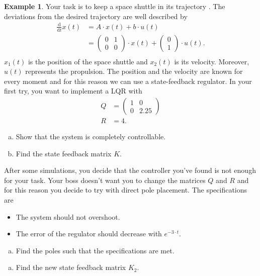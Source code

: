 \documentclass[a4paper,12 pt]{article}
\numberwithin{equation}{section}
\theoremstyle{definition}
\newtheorem{bsp}{Example}
\theoremstyle{remark}
\theoremstyle{definition}
\theoremstyle{definition}
\theoremstyle{definition}
\theoremstyle{remark}
\newcommand{\dd}[2]{\frac{\text{d}#1}{\text{d}#2}}
\begin{document}
\begin{bsp}
Your task is to keep a space shuttle in its trajectory . The deviations from the desired trajectory are well described by
\begin{equation*}
\begin{split}
 \dd{}{t} x(t) &= A \cdot x(t) + b \cdot u(t) \\
&= \begin{pmatrix} 0&1\\ 0&0 \end{pmatrix} \cdot x(t) + \begin{pmatrix} 0\\ 1\end{pmatrix} \cdot u(t). \\
 \end{split}
\end{equation*}
$x_1(t)$ is the position of the space shuttle and $x_2(t)$ is its velocity. Moreover, $u(t)$ represents the propulsion. The position and the velocity are known for every moment and for this reason we can use a state-feedback regulator. In your first try, you want to implement a LQR with
\begin{equation*}
\begin{split}
Q&=\begin{pmatrix}
1&0\\
0&2.25
\end{pmatrix}\\
R&=4.
\end{split}
\end{equation*}
\begin{enumerate}[(a)]
\item Show that the system is completely controllable.
\item Find the state feedback matrix $K$.
\end{enumerate}
After some simulations, you decide that the controller you've found is not enough for your task. Your boss doesn't want you to change the matrices $Q$ and $R$ and for this reason you decide to try with direct pole placement. The specifications are
\begin{itemize}
\item The system should not overshoot.
\item The error of the regulator should decrease with $e^{-3\cdot t}$.
\end{itemize}
\begin{enumerate}[(c)]
\item Find the poles such that the specifications are met.
\end{enumerate}
\begin{enumerate}[(d)]
\item Find the new state feedback matrix $K_2$.
\end{enumerate}



\end{bsp}
\end{document}
